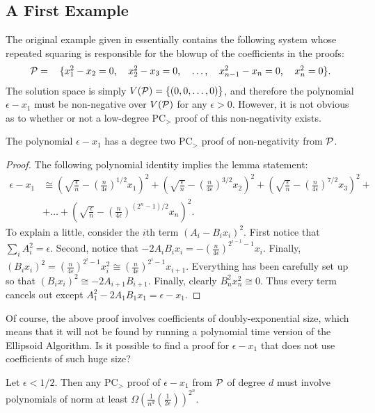 \subsection{A First Example}
The original example given in \cite{odonnell17} essentially contains the following system whose repeated squaring is responsible for the blowup of the coefficients in the proofs:
\[\begin{tabular}{cccccc}
$\cP = $ & $\{x_1^2 - x_2 = 0$, & $x_2^2 - x_3 = 0$, & $\dots$, & $x_{n-1}^2 - x_n = 0$, & $x_n^2 = 0\}$.
\end{tabular}\]
The solution space is simply $V(\mathcal P) = \{(0,0,\dots,0)\}$, and therefore the polynomial $\epsilon - x_1$ must be non-negative over $V(\mathcal P)$ for any $\epsilon > 0$. However, it is not obvious as to whether or not a low-degree PC$_>$ proof of this non-negativity exists.
\begin{lemma}
The polynomial $\epsilon - x_1$ has a degree two PC$_>$ proof of non-negativity from $\mathcal P$.
\end{lemma}
\begin{proof}
The following polynomial identity implies the lemma statement:
\begin{align}
\epsilon - x_1 &\cong\left(\sqrt{\frac{\epsilon}{n}} - \left(\frac{n}{4\epsilon}\right)^{1/2}x_1\right)^2 + \left(\sqrt{\frac{\epsilon}{n}} - \left(\frac{n}{4\epsilon}\right)^{3/2}x_2\right)^2 + \left(\sqrt{\frac{\epsilon}{n}} - \left(\frac{n}{4\epsilon}\right)^{7/2}x_3\right)^2 + \nonumber\\
&+\dots + \left(\sqrt{\frac{\epsilon}{n}} - \left(\frac{n}{4\epsilon}\right)^{(2^n-1)/2}x_n\right)^2.\label{eq:proof}\tag{$*$}
\end{align}
To explain a little, consider the $i$th term $(A_i - B_ix_i)^2$. First notice that $\sum_i A_i^2 = \epsilon$. Second, notice that $-2A_iB_ix_i = -\left(\frac{n}{4\epsilon}\right)^{2^{i-1}-1}x_i$. Finally, $(B_ix_i)^2 = \left(\frac{n}{4\epsilon}\right)^{2^i-1}x_i^2 \cong \left(\frac{n}{4\epsilon}\right)^{2^i-1}x_{i+1}$. Everything has been carefully set up so that $(B_ix_i)^2 \cong -2A_{i+1}B_{i+1}$. Finally, clearly $B_n^2x_n^2 \cong 0$. Thus every term cancels out except $A_1^2-2A_1B_1x_1 = \epsilon-x_1$. 
\end{proof}
%
Of course, the above proof involves coefficients of doubly-exponential size, which means that it will not be found by running a polynomial time version of the Ellipsoid Algorithm. Is it possible to find a proof for $\epsilon - x_1$ that does not use coefficients of such huge size?
\begin{lemma}\label{lem:nonbool-complex}
Let $\epsilon < 1/2$. Then any PC$_>$ proof of $\epsilon - x_1$ from $\mathcal P$ of degree $d$ must involve polynomials of norm at least $\Omega\left(\frac{1}{n^d}\left(\frac{1}{2\epsilon}\right)\right)^{2^n}$.
\end{lemma}
